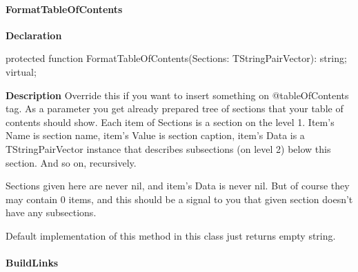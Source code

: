\documentclass{report}
\newif\ifpdf
\begin{document}
\paragraph*{FormatTableOfContents}\hspace*{\fill}

\label{PasDoc_Gen.TDocGenerator-FormatTableOfContents}
\begin{list}{}{
\setlength{\itemindent}{0cm}
\setlength{\listparindent}{0cm}
\setlength{\leftmargin}{\evensidemargin}
\addtolength{\leftmargin}{\tmplength}
\settowidth{\labelsep}{X}
\addtolength{\leftmargin}{\labelsep}
\setlength{\labelwidth}{\tmplength}
}
\item[\textbf{Declaration}\hfill]
\ifpdf
\begin{flushleft}
\fi
\begin{ttfamily}
protected function FormatTableOfContents(Sections: TStringPairVector): string; virtual;\end{ttfamily}

\ifpdf
\end{flushleft}
\fi

\par
\item[\textbf{Description}]
Override this if you want to insert something on @tableOfContents tag. As a parameter you get already prepared tree of sections that your table of contents should show. Each item of Sections is a section on the level 1. Item's Name is section name, item's Value is section caption, item's Data is a TStringPairVector instance that describes subsections (on level 2) below this section. And so on, recursively.

Sections given here are never nil, and item's Data is never nil. But of course they may contain 0 items, and this should be a signal to you that given section doesn't have any subsections.

Default implementation of this method in this class just returns empty string.

\end{list}
\paragraph*{BuildLinks}\hspace*{\fill}
\end{document}
